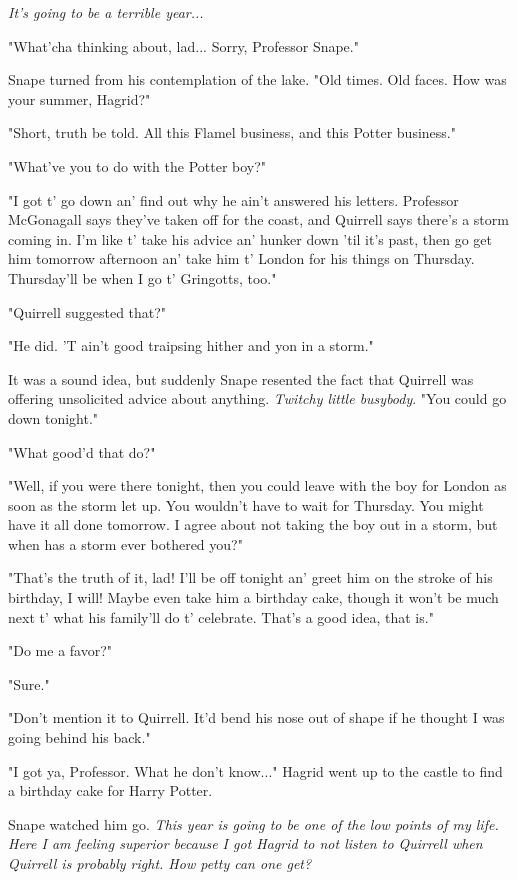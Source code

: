 \emph{It's going to be a terrible year...}

"What'cha thinking about, lad... Sorry, Professor Snape."

Snape turned from his contemplation of the lake. "Old times. Old faces. How was your summer, Hagrid?"

"Short, truth be told. All this Flamel business, and this Potter business."

"What've you to do with the Potter boy?"

"I got t' go down an' find out why he ain't answered his letters. Professor McGonagall says they've taken off for the coast, and Quirrell says there's a storm coming in. I'm like t' take his advice an' hunker down 'til it's past, then go get him tomorrow afternoon an' take him t' London for his things on Thursday. Thursday'll be when I go t' Gringotts, too."

"Quirrell suggested that?"

"He did. 'T ain't good traipsing hither and yon in a storm."

It was a sound idea, but suddenly Snape resented the fact that Quirrell was offering unsolicited advice about anything. \emph{Twitchy little busybody}. "You could go down tonight."

"What good'd that do?"

"Well, if you were there tonight, then you could leave with the boy for London as soon as the storm let up. You wouldn't have to wait for Thursday. You might have it all done tomorrow. I agree about not taking the boy out in a storm, but when has a storm ever bothered you?"

"That's the truth of it, lad! I'll be off tonight an' greet him on the stroke of his birthday, I will! Maybe even take him a birthday cake, though it won't be much next t' what his family'll do t' celebrate. That's a good idea, that is."

"Do me a favor?"

"Sure."

"Don't mention it to Quirrell. It'd bend his nose out of shape if he thought I was going behind his back."

"I got ya, Professor. What he don't know..." Hagrid went up to the castle to find a birthday cake for Harry Potter.

Snape watched him go. \emph{This year is going to be one of the low points of my life. Here I am feeling superior because I got Hagrid to not listen to Quirrell when Quirrell is probably right. How petty can one get?}

